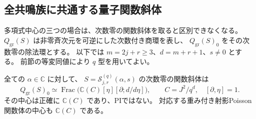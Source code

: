 \subsection{全共鳴族に共通する量子関数斜体}
\label{subsec:affine-quantum-field-v34}

多項式中心の三つの場合は、次数零の関数斜体を取ると区別できなくなる。
$Q_{\mathrm{gr}}(S)$ は非零斉次元を可逆にした次数付き商環を表し、
$Q_{\mathrm{gr}}(S)_0$ をその次数零の除法環とする。
以下では $m=2j+r\ge3$、$d=m+r+1$、$s\ne0$ とする。
前節の等変同値により $q$ 型を用いてよい。

\begin{proposition}[共通のWeyl斜体]
\label{prop:affine-quantum-field-v34}
全ての $\alpha\in\mathbb C$ に対して、
$S=\mathcal S_{j,r}^{(q)}(\alpha,s)$ の次数零の関数斜体は
\[
 \boxed{
 Q_{\mathrm{gr}}(S)_0
 \simeq\operatorname{Frac}\bigl(\mathbb C(C)[\eta][\partial;d/d\eta]\bigr),
 \qquad C=J^2/q^d,
 \quad[\partial,\eta]=1.
 }
\]
その中心は正確に $\mathbb C(C)$ であり、PIではない。
対応する重み付き射影Poisson関数体の中心も $\mathbb C(C)$ である。
\end{proposition}

